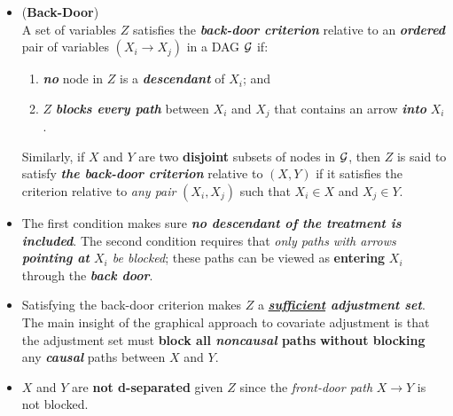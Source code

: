 \documentclass[11pt]{article}
\begin{document}
\begin{itemize}
\item 
\begin{definition}(\textbf{Back-Door}) \citep{pearl2000causal}\\
A set of variables $Z$ satisfies the \emph{\textbf{back-door criterion}} relative to an \emph{\textbf{ordered}} pair of variables $(X_i \rightarrow X_j)$ in a DAG ${\mathcal G}$ if:
\begin{enumerate}
\item \emph{\textbf{no}} node in $Z$ is a \emph{\textbf{descendant}} of $X_i$; and
\item $Z$ \emph{\textbf{blocks every path}} between $X_i$ and $X_j$ that contains an arrow \textbf{\emph{into}} $X_i$.
\end{enumerate}
Similarly, if $X$ and $Y$ are two \textbf{disjoint} subsets of nodes in ${\mathcal G}$, then $Z$ is said to satisfy \textbf{\emph{the back-door criterion}} relative to $(X, Y)$ if it satisfies the criterion relative to \emph{any pair} $(X_i, X_j)$ such that $X_i \in X$ and $X_j \in Y$.
\end{definition} 

\item The first condition makes sure \emph{\textbf{no descendant of the treatment is included}}. The second condition requires that \emph{only paths with arrows \textbf{pointing at} $X_i$ be blocked}; these paths can be viewed as \textbf{entering} $X_i$ through the \emph{\textbf{back door}}.


\item  Satisfying the back-door criterion makes $Z$ a \emph{\textbf{\underline{sufficient} adjustment set}}. The main insight of the graphical approach to covariate adjustment is that the adjustment set must \textbf{block all \emph{noncausal} paths} \textbf{without blocking} any \emph{\textbf{causal}} paths between $X$ and $Y$. 

\item $X$ and $Y$ are \textbf{not d-separated} given $Z$ since the \emph{front-door path} $X \rightarrow Y$ is not blocked. 


\end{itemize}
\end{document}
